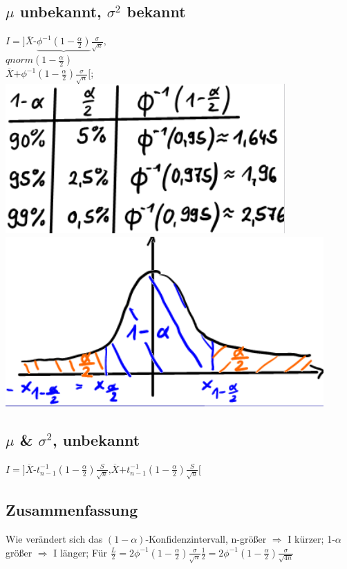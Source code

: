   \subsection{$ \mu $ unbekannt, $ \sigma^{2} $ bekannt}
  $ I = ] \overline{X} \textbf{-} \underbrace{\phi^{-1}( 1-\frac{\alpha}{2} ) } \frac{\sigma}{ \sqrt{n} }\textbf{,} $\\ 
  $ qnorm ( 1-\frac{\alpha}{2} ) $\\
  $ \overline{X} \textbf{+} \phi^{-1} ( 1- \frac{\alpha}{2} ) \frac{\sigma}{ \sqrt{n} } [ $; 
  \includegraphics[scale=0.25]{./pic/QnormTabelle.png}
  \includegraphics[scale=0.25]{./pic/KonfidenzintervallDichtefunktionTabelle.png}

  \subsection{$ \mu $ \& $ \sigma^{2} $, unbekannt }
  $ I = ] \overline{X} \textbf{-} t_{n-1}^{-1} ( 1-\frac{\alpha}{2} ) \frac{S}{ \sqrt{n} } \textbf{,} \overline{X}  \textbf{+} t_{n-1}^{-1} ( 1-\frac{\alpha}{2} )\frac{S}{ \sqrt{n} } [ $
  \subsection{Zusammenfassung}
  Wie verändert sich das $ (1 - \alpha ) $-Konfidenzintervall, n-größer $\Rightarrow$ I kürzer; 1-$ \alpha $ größer $ \Rightarrow $ I länger; 
  \newline
  \newline
  Für $ \frac{L}{2} = 2 \phi^{-1}( 1-\frac{ \alpha}{2} ) \frac{\sigma}{ \sqrt{n} } \frac{1}{2} = 2 \phi^{-1} ( 1- \frac{ \alpha }{2} ) \frac{\sigma}{ \sqrt{4n} } $
